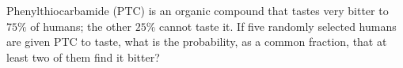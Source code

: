 Phenylthiocarbamide (PTC) is an organic compound that tastes very bitter to $75\%$ of humans; the other $25\%$ cannot taste it. If five randomly selected humans are given PTC to taste, what is the probability, as a common fraction, that at least two of them find it bitter?
